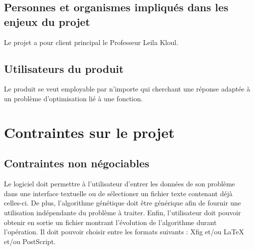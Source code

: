 \documentclass[a4paper,11pt]{article}
\begin{document}
		\subsection{Personnes et organismes impliqués dans les enjeux du projet}
			Le projet a pour client principal le Professeur Leila Kloul.
			
		\subsection{ Utilisateurs du produit}
			Le produit se veut employable par n’importe qui cherchant une réponse adaptée à un problème d’optimisation lié à une fonction.
			
	\section{Contraintes sur le projet}
		\subsection{Contraintes non négociables}
			Le logiciel doit permettre à l’utilisateur d’entrer les données de son problème dans une interface textuelle ou de sélectioner un fichier texte contenant déjà celles-ci.
			De plus, l’algorithme génétique doit être générique afin de fournir une utilisation indépendante du problème à traiter. 
			Enfin, l’utilisateur doit pouvoir obtenir en sortie un fichier montrant l’évolution de l’algorithme durant l’opération.
			Il doit pouvoir choisir entre les formats suivants : Xfig et/ou  LaTeX et/ou PostScript.
		
\end{document}
